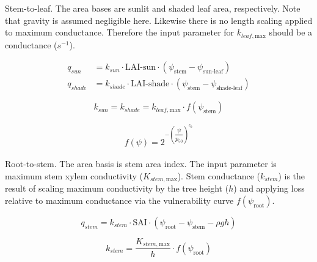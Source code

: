\documentclass[draft,linenumbers]{agujournal}
\begin{document}
Stem-to-leaf. The area bases are sunlit and shaded leaf area, respectively. 
Note that gravity is assumed negligible here. 
Likewise there is no length scaling applied to maximum conductance. 
Therefore the input parameter for $k_{leaf,\text{max}}$ should be a conductance ($s^{-1}$).

\begin{linenomath*} \begin{equation} \begin{aligned}
q_{sun} &= k_{sun} \cdot \text{LAI-sun}  \cdot \left( \psi_{\text{stem}}-\psi_{\text{sun-leaf}}\right) \\
q_{shade} &= k_{shade} \cdot \text{LAI-shade} \cdot  \left( \psi_{\text{stem}}-\psi_{\text{shade-leaf}}\right)
\end{aligned} \end{equation} \end{linenomath*}

\begin{linenomath*} \begin{equation}
k_{sun} = k_{shade} = k_{leaf,\text{max}} \cdot f\left(\psi_{\text{stem}}\right)
\end{equation} \end{linenomath*}

\begin{linenomath*} \begin{equation} \begin{aligned}
f\left(\psi\right)=2^{-\left(\dfrac{\psi}{p_{50}}\right)^{c_k}}
\end{aligned} \end{equation} \end{linenomath*}

Root-to-stem. The area basis is stem area index. 
The input parameter is maximum stem xylem conductivity ($K_{stem,\text{max}}$).
Stem conductance ($k_{stem}$) is the result of scaling maximum conductivity by the tree height ($h$)
and applying loss relative to maximum conductance via the vulnerability curve $f\left(\psi_{\text{root}}\right)$. 
\begin{linenomath*} \begin{equation}
q_{stem} = k_{stem} \cdot  \text{SAI}  \cdot \left( \psi_{\text{root}}-\psi_{\text{stem}}-\rho g h\right)
\end{equation} \end{linenomath*}
\begin{linenomath*} \begin{equation}
k_{stem} = \dfrac{K_{stem,\text{max}}}{h} \cdot f\left(\psi_{\text{root}}\right)
\end{equation} \end{linenomath*}
\end{document}
